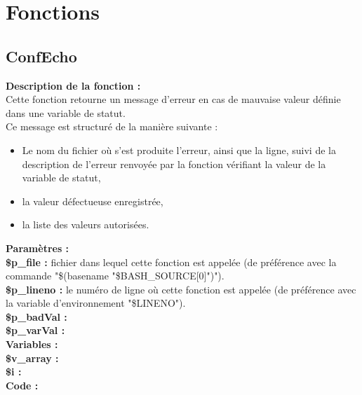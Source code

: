 \documentclass[a4paper,10pt]{article}
\begin{document}
\section{Fonctions}\color{white}

\color{green}
\subsection{ConfEcho}\color{white}
\begin{flushleft}
	\textbf{Description de la fonction :}\\
   	Cette fonction retourne un message d'erreur en cas de mauvaise valeur définie dans une variable de statut.\\[1\baselineskip]
   	Ce message est structuré de la manière suivante :\\
   	\begin{itemize}
   		\item Le nom du fichier où s'est produite l'erreur, ainsi que la ligne, suivi de la description de l'erreur renvoyée par la fonction vérifiant la valeur de la variable de statut,
   		\item la valeur défectueuse enregistrée,
   		\item la liste des valeurs autorisées.\\[1\baselineskip]
   	\end{itemize}

   	\textbf{Paramètres :}\\
   	\color{orange}\textbf{\$p\_file\color{white} :} \color{white} fichier dans lequel cette fonction est appelée (de préférence avec la commande "\$(\color{gray}basename \color{white}"\color{orange}\$BASH\_SOURCE[0]\color{white}")").\\
   	\color{orange}\textbf{\$p\_lineno\color{white} :} \color{white} le numéro de ligne où cette fonction est appelée (de préférence avec la variable d'environnement "\color{orange}\$LINENO\color{white}").\\
   	\color{orange}\textbf{\$p\_badVal\color{white} :} \color{white}\\
   	\color{orange}\textbf{\$p\_varVal\color{white} :} \color{white}\\[1\baselineskip]
    
   	\textbf{Variables :}\\
   	\color{orange}\textbf{\$v\_array\color{white} :} \color{white} \\
   	\color{orange}\textbf{\$i\color{white} :} \color{white}\\[1\baselineskip]

    \textbf{Code :}\\
\end{flushleft}
\end{document}
